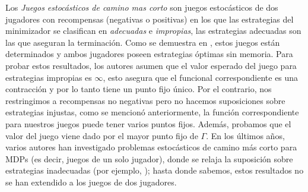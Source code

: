 

















	Los \emph{Juegos estocásticos de camino mas corto} \cite{PatekBertsekas99} son juegos estocásticos de dos jugadores con recompensas (negativas o positivas) en los que las estrategias del minimizador se clasifican en \emph{adecuadas} e \emph{impropias},
las estrategias adecuadas son las que aseguran la terminación. Como se demuestra en \cite{PatekBertsekas99}, estos juegos están determinados y ambos jugadores poseen estrategias óptimas sin memoria. Para probar estos resultados, los autores asumen que el valor esperado del juego para estrategias impropias es $\infty$, esto asegura que el funcional correspondiente es una contracción y por lo tanto tiene un punto fijo único. Por el contrario, nos restringimos a recompensas no negativas pero no hacemos suposiciones sobre estrategias injustas, como se mencionó anteriormente, la función correspondiente para nuestros juegos puede tener varios puntos fijos. Además, probamos que el valor del juego viene dado por el mayor punto fijo de $\Gamma$. En los últimos años, varios autores han investigado problemas estocásticos de camino más corto para MDPs (es decir, juegos de un solo jugador), donde se relaja la suposición sobre estrategias inadecuadas (por ejemplo, \cite{DBLP:conf/lics/Baier0DGS18}); hasta donde sabemos, estos resultados no se han extendido a los juegos de dos jugadores.

	
